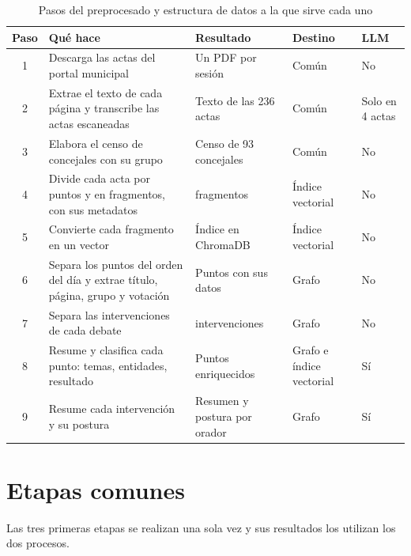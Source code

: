 \documentclass[11pt, a4paper]{report}
\begin{document}
	\begin{table}[H]
		\centering
		\begin{tabularx}{\linewidth}{|c|>{\raggedright\arraybackslash}X|>{\raggedright\arraybackslash}X|>{\centering\arraybackslash}p{2.2cm}|>{\centering\arraybackslash}p{1.6cm}|}
			\hline
			\rowcolor{tabla-header}
			\textbf{Paso} & \textbf{Qué hace} & \textbf{Resultado} & \textbf{Destino} & \textbf{LLM} \\
			\hline
			1 & Descarga las actas del portal municipal & Un PDF por sesión & Común & No \\
			\hline
			\rowcolor{fila-alterna}
			2 & Extrae el texto de cada página y transcribe las actas escaneadas & Texto de las 236 actas & Común & Solo en 4 actas \\
			\hline
			3 & Elabora el censo de concejales con su grupo & Censo de 93 concejales & Común & No \\
			\hline
			\rowcolor{fila-alterna}
			4 & Divide cada acta por puntos y en fragmentos, con sus metadatos & 97.217 fragmentos & Índice vectorial & No \\
			\hline
			5 & Convierte cada fragmento en un vector & Índice en ChromaDB & Índice vectorial & No \\
			\hline
			\rowcolor{fila-alterna}
			6 & Separa los puntos del orden del día y extrae título, página, grupo y votación & Puntos con sus datos & Grafo & No \\
			\hline
			7 & Separa las intervenciones de cada debate & 18.581 intervenciones & Grafo & No \\
			\hline
			\rowcolor{fila-alterna}
			8 & Resume y clasifica cada punto: temas, entidades, resultado & Puntos enriquecidos & Grafo e índice vectorial & Sí \\
			\hline
			9 & Resume cada intervención y su postura & Resumen y postura por orador & Grafo & Sí \\
			\hline
		\end{tabularx}
		\caption{Pasos del preprocesado y estructura de datos a la que sirve cada uno}
		\label{tab:pipeline}
	\end{table}

	\section{Etapas comunes}
	\label{sec:prep-comun}

	Las tres primeras etapas se realizan una sola vez y sus resultados los
	utilizan los dos procesos.
\end{document}
